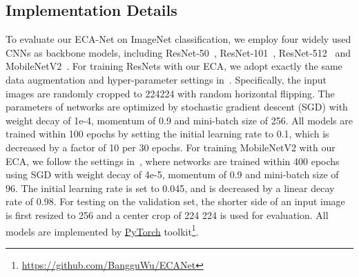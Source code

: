 \documentclass[10pt,twocolumn,letterpaper]{article}
\begin{document}
\subsection{Implementation Details}
To evaluate our ECA-Net on ImageNet classification, we employ four widely used CNNs as backbone models, including ResNet-50~\cite{He_2016_CVPR}, ResNet-101~\cite{He_2016_CVPR}, ResNet-512~\cite{He_2016_CVPR} and MobileNetV2~\cite{DBLP:conf/cvpr/SandlerHZZC18}. For training ResNets with our ECA, we adopt exactly the same data augmentation and hyper-parameter settings in~\cite{He_2016_CVPR,SENet18}. Specifically, the input images are randomly cropped to 224224 with random horizontal flipping. The parameters of networks are optimized by stochastic gradient descent (SGD) with weight decay of 1e-4, momentum of 0.9 and mini-batch size of 256. All models are trained within 100 epochs by setting the initial learning rate to 0.1, which is decreased by a factor of 10 per 30 epochs. For training MobileNetV2 with our ECA, we follow the settings in~\cite{DBLP:conf/cvpr/SandlerHZZC18}, where networks are trained within 400 epochs using SGD with weight decay of 4e-5, momentum of 0.9 and mini-batch size of 96. The initial learning rate is set to 0.045, and is decreased by a linear decay rate of 0.98. For testing on the validation set, the shorter side of an input image is first resized to 256 and a center crop of 224  224 is used for evaluation. All models are implemented by \href{https://github.com/pytorch/pytorch}{PyTorch} toolkit\footnote{\url{https://github.com/BangguWu/ECANet}}.
\end{document}
